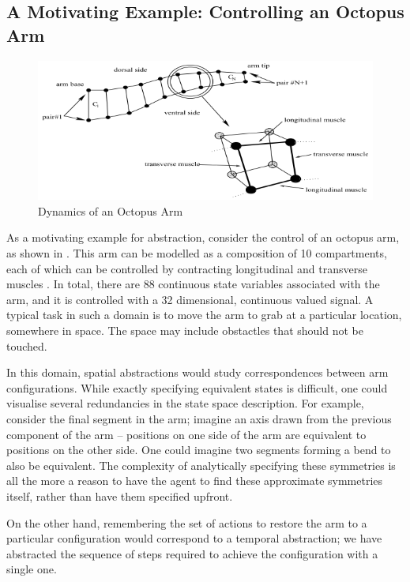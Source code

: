 \subsection{A Motivating Example: Controlling an Octopus Arm}

\begin{figure}[ht]
  \centering
  \includegraphics[width=5in]{figures/octopus-arm} 
  \caption{Dynamics of an Octopus Arm}
  \label{fig:octopus-arm}
\end{figure}

As a motivating example for abstraction, consider the control of an
octopus arm, as shown in . This arm can be
modelled as a composition of 10 compartments, each of which can be
controlled by contracting longitudinal and transverse muscles
\citep{Engel2006}. In total, there are 88 continuous state variables
associated with the arm, and it is controlled with a 32 dimensional,
continuous valued signal. A typical task in such a domain is to move
the arm to grab at a particular location, somewhere in space. The
space may include obstactles that should not be touched.

In this domain, spatial abstractions would study correspondences
between arm configurations. While exactly specifying equivalent states
is difficult, one could visualise several redundancies in the state
space description. For example, consider the final segment in the arm;
imagine an axis drawn from the previous component of the arm --
positions on one side of the arm are equivalent to positions on the
other side. One could imagine two segments forming a bend to also be
equivalent. The complexity of analytically specifying these symmetries
is all the more a reason to have the agent to find these approximate
symmetries itself, rather than have them specified upfront. 

On the other hand, remembering the set of actions to restore the arm
to a particular configuration would correspond to a temporal
abstraction; we have abstracted the sequence of steps required to
achieve the configuration with a single one. 


